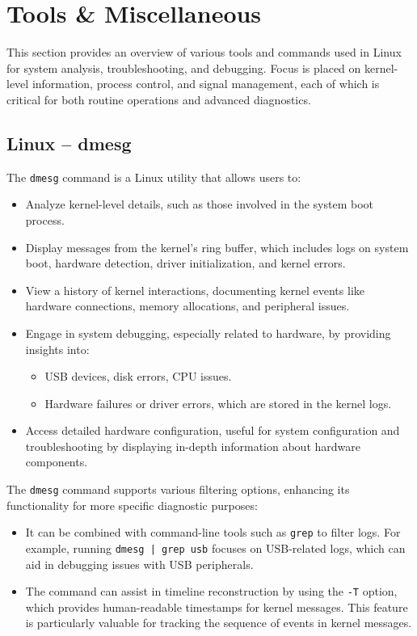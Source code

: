 \chapter{Tools \& Miscellaneous}


This section provides an overview of various tools and commands used in Linux for system analysis, troubleshooting, and debugging. Focus is placed on kernel-level information, process control, and signal management, each of which is critical for both routine operations and advanced diagnostics.

\section{Linux – dmesg}

The \texttt{dmesg} command is a Linux utility that allows users to:
\begin{itemize}
    \item Analyze kernel-level details, such as those involved in the system boot process.
    \item Display messages from the kernel’s ring buffer, which includes logs on system boot, hardware detection, driver initialization, and kernel errors.
    \item View a history of kernel interactions, documenting kernel events like hardware connections, memory allocations, and peripheral issues.
    \item Engage in system debugging, especially related to hardware, by providing insights into:
    \begin{itemize}
        \item USB devices, disk errors, CPU issues.
        \item Hardware failures or driver errors, which are stored in the kernel logs.
    \end{itemize}
    \item Access detailed hardware configuration, useful for system configuration and troubleshooting by displaying in-depth information about hardware components.
\end{itemize}

The \texttt{dmesg} command supports various filtering options, enhancing its functionality for more specific diagnostic purposes:
\begin{itemize}
    \item It can be combined with command-line tools such as \texttt{grep} to filter logs. For example, running \texttt{dmesg | grep usb} focuses on USB-related logs, which can aid in debugging issues with USB peripherals.
    \item The command can assist in timeline reconstruction by using the \texttt{-T} option, which provides human-readable timestamps for kernel messages. This feature is particularly valuable for tracking the sequence of events in kernel messages.
\end{itemize}

